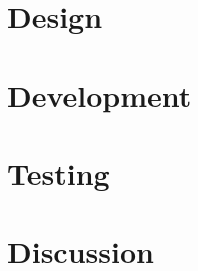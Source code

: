 \chapter{Design}
\label{chap:design}




%

\chapter{Development}
\label{chap:development}



\chapter{Testing} 
\label{chap:testing}


\chapter{Discussion}
\label{chap:Discussion}


\begingroup
	\raggedright
\endgroup



\clearforchapter

\appendix	%











